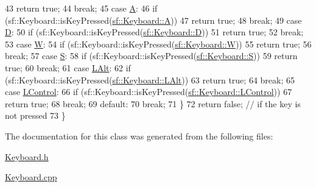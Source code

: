 \begin{DoxyCode}
43             \textcolor{keywordflow}{return} \textcolor{keyword}{true};
44         \textcolor{keywordflow}{break};
45     \textcolor{keywordflow}{case} \hyperlink{Structures_8h_a9d66cf9d9353142caa803c8a93e95e4ba42a4ade1acd55a49164099104990e09f}{A}:
46         \textcolor{keywordflow}{if} (sf::Keyboard::isKeyPressed(\hyperlink{Structures_8h_a9d66cf9d9353142caa803c8a93e95e4ba42a4ade1acd55a49164099104990e09f}{sf::Keyboard::A}))
47             \textcolor{keywordflow}{return} \textcolor{keyword}{true};
48         \textcolor{keywordflow}{break};
49     \textcolor{keywordflow}{case} \hyperlink{Structures_8h_a9d66cf9d9353142caa803c8a93e95e4ba77a6b11f9898c052926f1d49765861e8}{D}:
50         \textcolor{keywordflow}{if} (sf::Keyboard::isKeyPressed(\hyperlink{Structures_8h_a9d66cf9d9353142caa803c8a93e95e4ba77a6b11f9898c052926f1d49765861e8}{sf::Keyboard::D}))
51             \textcolor{keywordflow}{return} \textcolor{keyword}{true};
52         \textcolor{keywordflow}{break};
53     \textcolor{keywordflow}{case} \hyperlink{Structures_8h_a9d66cf9d9353142caa803c8a93e95e4bab722ceeb601c72cd78fbd35f3581fdf7}{W}:
54         \textcolor{keywordflow}{if} (sf::Keyboard::isKeyPressed(\hyperlink{Structures_8h_a9d66cf9d9353142caa803c8a93e95e4bab722ceeb601c72cd78fbd35f3581fdf7}{sf::Keyboard::W}))
55             \textcolor{keywordflow}{return} \textcolor{keyword}{true};
56         \textcolor{keywordflow}{break};
57     \textcolor{keywordflow}{case} \hyperlink{Structures_8h_a9d66cf9d9353142caa803c8a93e95e4baf1ce01387d2348f8b858721a7db81670}{S}:
58         \textcolor{keywordflow}{if} (sf::Keyboard::isKeyPressed(\hyperlink{Structures_8h_a9d66cf9d9353142caa803c8a93e95e4baf1ce01387d2348f8b858721a7db81670}{sf::Keyboard::S}))
59             \textcolor{keywordflow}{return} \textcolor{keyword}{true};
60         \textcolor{keywordflow}{break};
61     \textcolor{keywordflow}{case} \hyperlink{Structures_8h_a9d66cf9d9353142caa803c8a93e95e4ba751229d0124103f5a3eb8ec500ca744a}{LAlt}:
62         \textcolor{keywordflow}{if} (sf::Keyboard::isKeyPressed(\hyperlink{Structures_8h_a9d66cf9d9353142caa803c8a93e95e4ba751229d0124103f5a3eb8ec500ca744a}{sf::Keyboard::LAlt}))
63             \textcolor{keywordflow}{return} \textcolor{keyword}{true};
64         \textcolor{keywordflow}{break};
65     \textcolor{keywordflow}{case} \hyperlink{Structures_8h_a9d66cf9d9353142caa803c8a93e95e4ba480f096d1c429f97aff5be1c89cb25c6}{LControl}:
66         \textcolor{keywordflow}{if} (sf::Keyboard::isKeyPressed(\hyperlink{Structures_8h_a9d66cf9d9353142caa803c8a93e95e4ba480f096d1c429f97aff5be1c89cb25c6}{sf::Keyboard::LControl}))
67             \textcolor{keywordflow}{return} \textcolor{keyword}{true};
68         \textcolor{keywordflow}{break};
69     \textcolor{keywordflow}{default}:
70         \textcolor{keywordflow}{break};
71     \}
72     \textcolor{keywordflow}{return} \textcolor{keyword}{false}; \textcolor{comment}{// if the key is not pressed}
73 \}
\end{DoxyCode}


The documentation for this class was generated from the following files\-:\begin{DoxyCompactItemize}
\item 
\hyperlink{Keyboard_8h}{Keyboard.\-h}\item 
\hyperlink{Keyboard_8cpp}{Keyboard.\-cpp}\end{DoxyCompactItemize}
